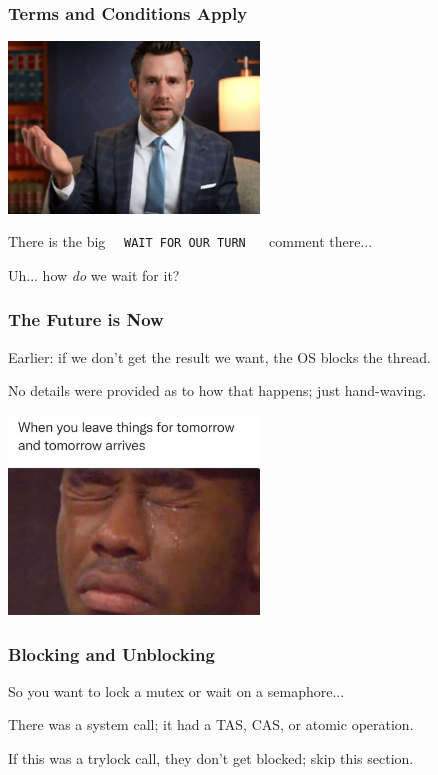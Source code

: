 \begin{frame}
\frametitle{Terms and Conditions Apply}

\begin{center}
	\includegraphics[width=0.5\textwidth]{images/legaleagle.png}
\end{center}

There is the big ~~\texttt{WAIT FOR OUR TURN} ~~ comment there...

Uh... how \textit{do} we wait for it?

\end{frame}

\begin{frame}
\frametitle{The Future is Now}

Earlier: if we don't get the result we want, the OS blocks the thread.

No details were provided as to how that happens; just hand-waving.

\begin{center}
	\includegraphics[width=0.5\textwidth]{images/tomorrow.png}
\end{center}

\end{frame}

\begin{frame}
\frametitle{Blocking and Unblocking}

So you want to lock a mutex or wait on a semaphore...

There was a system call; it had a TAS, CAS, or atomic operation.

If this was a trylock call, they don't get blocked; skip this section.

\end{frame}

